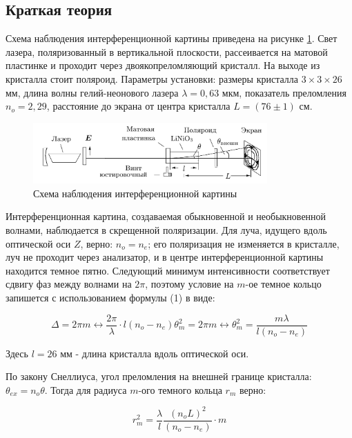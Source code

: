 \documentclass[15pt,a5paper,reqno]{article}
\begin{document}
	\subsection{Краткая теория}
	
	Схема наблюдения интерференционной картины приведена на рисунке \ref{shema}. Свет лазера, поляризованный в вертикальной плоскости, рассеивается на матовой пластинке и проходит через двоякопреломляющий кристалл. На выходе из кристалла стоит поляроид. Параметры установки: размеры кристалла $3 \times 3 \times 26$ мм, длина волны гелий-неонового лазера $\lambda = 0,63$ мкм, показатель преломления $n_o = 2,29$, расстояние до экрана от центра кристалла $L = (76 \pm 1)$ см. 
	
	\begin{figure}[h!]
		\centering	
		\includegraphics[width=0.8\textwidth]{pics/shema.png}
		\caption{Схема наблюдения интерференционной картины}
		\label{shema}
	\end{figure}
	
	Интерференционная картина, создаваемая обыкновенной и необыкновенной волнами, наблюдается в скрещенной поляризации. Для луча, идущего вдоль оптической оси $Z$, верно: $n_o = n_e$; его поляризация не изменяется в кристалле, луч не проходит через анализатор, и в центре интерференционной картины находится темное пятно. Следующий минимум интенсивности соответствует сдвигу фаз между волнами на $2\pi$, поэтому условие на $m$-ое темное кольцо запишется с использованием формулы (1) в виде:
	
	\[ \Delta = 2\pi m \leftrightarrow \frac{2\pi}{\lambda}\cdot l (n_o - n_e)\theta_m^2 = 2\pi m \leftrightarrow \theta_m^2 = \frac{m\lambda}{l(n_o - n_e)} \] 
	
	Здесь $l = 26$ мм - длина кристалла вдоль оптической оси.
	
	По закону Снеллиуса, угол преломления на внешней границе кристалла: $\theta_{ex} = n_o\theta$. Тогда для радиуса $m$-ого темного кольца $r_m$ верно: 

	\begin{equation}	
		r_m^2 = \frac{\lambda}{l} \frac{(n_oL)^2}{(n_o - n_e)} \cdot m
	\end{equation}
	
\end{document}
